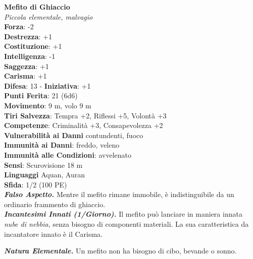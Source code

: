 \begin{multicols}{2}
\medskip\textbf{Mefito di Ghiaccio}\\
\emph{Piccola elementale, malvagio}\\
\textbf{Forza}: -2\\
\textbf{Destrezza}: +1\\
\textbf{Costituzione}: +1\\
\textbf{Intelligenza}: -1\\
\textbf{Saggezza}: +1\\
\textbf{Carisma}: +1\\
\textbf{Difesa}: 13 - \textbf{Iniziativa}: +1\\
\textbf{Punti Ferita}: 21 (6d6)\\
\textbf{Movimento}: 9 m, volo 9 m \\
\textbf{Tiri Salvezza}: Tempra +2, Riflessi +5, Volontà +3\\
\textbf{Competenze}: Criminalità +3, Consapevolezza +2\\
\textbf{Vulnerabilità ai Danni} contundenti, fuoco\\
\textbf{Immunità ai Danni}: freddo, veleno\\
\textbf{Immunità alle Condizioni}: avvelenato\\
\textbf{Sensi}: Scurovisione 18 m\\
\textbf{Linguaggi} Aquan, Auran\\
\textbf{Sfida}: 1/2 (100 PE)\smallskip\\
\emph{\textbf{Falso Aspetto.}} Mentre il mefito rimane immobile, è indistinguibile da un ordinario frammento di ghiaccio.\\
\emph{\textbf{Incantesimi Innati (1/Giorno).}} Il mefito può lanciare in maniera innata \emph{nube di nebbia}, senza bisogno di componenti materiali. La sua caratteristica da incantatore innato è il Carisma.

\emph{\textbf{Natura Elementale.}} Un mefito non ha bisogno di cibo, bevande o sonno.\\


\end{multicols}
